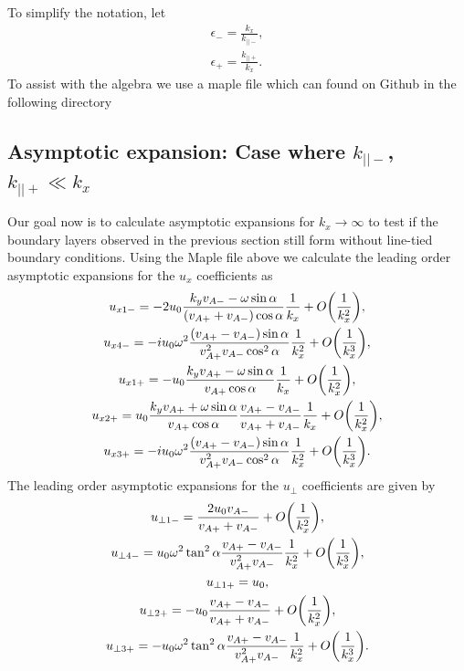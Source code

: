 To simplify the notation, let
\begin{gather}
    \epsilon_- = \frac{k_x}{k_{||-}}, \\
    \epsilon_+ = \frac{k_{||+}}{k_x}.
\end{gather}
To assist with the algebra we use a maple file which can found on Github in the following directory
\[\text{}\]


\subsection{Asymptotic expansion: Case where \texorpdfstring{$k_{||-}$, $k_{||+} \ll k_x$}{k||-, k||+ << kx}}

Our goal now is to calculate asymptotic expansions for $k_x\rightarrow\infty$ to test if the boundary layers observed in the previous section still form without line-tied boundary conditions. Using the Maple file above we calculate the leading order asymptotic expansions for the $u_x$ coefficients as
\begin{gather}
    \label{eq:oblique_field_uniform_in_x_ux10-}
    u_{x 1-} = -2u_0\frac{k_yv_{A-}-\omega\sin\alpha}{(v_{A+}+v_{A-})\cos\alpha}\frac{1}{k_x} + O\qty(\frac{1}{k_x^2}), \\
    u_{x 4-} = -iu_0\omega^2\frac{(v_{A+}-v_{A-})\sin\alpha}{v_{A+}^2v_{A-}\cos^2\alpha}\frac{1}{k_x^2} + O\qty(\frac{1}{k_x^3}), \\
    u_{x 1+} = -u_0\frac{k_yv_{A+}-\omega\sin\alpha}{v_{A+}\cos\alpha}\frac{1}{k_x} + O\qty(\frac{1}{k_x^2}), \\
    u_{x 2+} = u_0\frac{k_yv_{A+}+\omega\sin\alpha}{v_{A+}\cos\alpha}\frac{v_{A+}-v_{A-}}{v_{A+}+v_{A-}}\frac{1}{k_x} + O\qty(\frac{1}{k_x^2}), \\
    u_{x 3+} = -iu_0\omega^2\frac{(v_{A+}-v_{A-})\sin\alpha}{v_{A+}^2v_{A-}\cos^2\alpha}\frac{1}{k_x^2} + O\qty(\frac{1}{k_x^3}).
\end{gather}
The leading order asymptotic expansions for the $u_\perp$ coefficients are given by
\begin{gather}
    u_{\perp 1-} = \frac{2u_0v_{A-}}{v_{A+}+v_{A-}} + O\qty(\frac{1}{k_x^2}), \\
    u_{\perp 4-} = u_0\omega^2\tan^2\alpha\frac{v_{A+}-v_{A-}}{v_{A+}^2v_{A-}}\frac{1}{k_x^2} + O\qty(\frac{1}{k_x^3}), \\
    u_{\perp 1+} = u_0, \\
    u_{\perp 2+} = -u_0\frac{v_{A+}-v_{A-}}{v_{A+}+v_{A-}} + O\qty(\frac{1}{k_x^2}), \\
    \label{eq:oblique_field_uniform_in_x_u_perp30+}
    u_{\perp 3+} = -u_0\omega^2\tan^2\alpha\frac{v_{A+}-v_{A-}}{v_{A+}^2v_{A-}}\frac{1}{k_x^2} + O\qty(\frac{1}{k_x^3}).
\end{gather}
